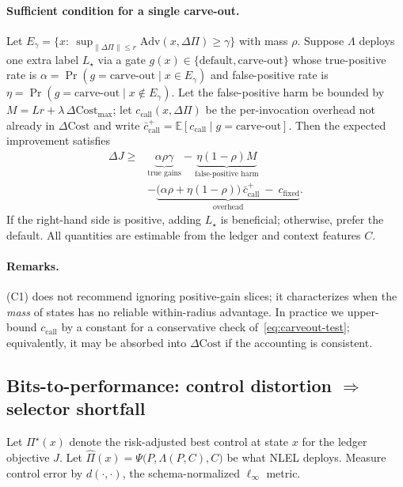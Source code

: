 \documentclass{article}
\theoremstyle{plain}
\theoremstyle{definition}
\theoremstyle{remark}
\begin{document}
\paragraph{Sufficient condition for a single carve-out.}
Let $E_\gamma=\{x:\ \sup_{\|\Delta\Pi\|\le r}\mathrm{Adv}(x,\Delta\Pi)\ge \gamma\}$ with mass $\rho$. 
Suppose $\Lambda$ deploys one extra label $L_\star$ via a gate $g(x)\in\{\text{default},\text{carve-out}\}$ whose true-positive rate is $\alpha=\Pr(g=\text{carve-out}\mid x\in E_\gamma)$ and false-positive rate is $\eta=\Pr(g=\text{carve-out}\mid x\notin E_\gamma)$. 
Let the false-positive harm be bounded by $M=Lr+\lambda\,\Delta\mathrm{Cost}_{\max}$; let $c_{\text{call}}(x,\Delta\Pi)$ be the per-invocation overhead not already in $\Delta\mathrm{Cost}$ and write $\bar c_{\text{call}}^{+}=\mathbb{E}[c_{\text{call}}\mid g=\text{carve-out}]$. 
Then the expected improvement satisfies
\begin{equation}\label{eq:carveout-test}
\begin{aligned}
\Delta J \ge {}& \underbrace{\alpha\rho\gamma}_{\text{true gains}}
 - \underbrace{\eta(1-\rho)M}_{\text{false-positive harm}} \\
& - \underbrace{\big(\alpha\rho+\eta(1-\rho)\big)\,\bar c_{\text{call}}^{+}\ -\ c_{\text{fixed}}}_{\text{overhead}}.
\end{aligned}
\end{equation}
If the right-hand side is positive, adding $L_\star$ is beneficial; otherwise, prefer the default. 
All quantities are estimable from the ledger and context features $C$.

\paragraph{Remarks.}
(C1) does not recommend ignoring positive-gain slices; it characterizes when the \emph{mass} of states has no reliable within-radius advantage. 
In practice we upper-bound $c_{\text{call}}$ by a constant for a conservative check of~\eqref{eq:carveout-test}; equivalently, it may be absorbed into $\Delta\mathrm{Cost}$ if the accounting is consistent.

\subsection{Bits-to-performance: control distortion $\Rightarrow$ selector shortfall}

Let $\Pi^\star(x)$ denote the risk-adjusted best control at state $x$ for the ledger objective $J$. 
Let $\widehat{\Pi}(x)=\Psi\big(P,\Lambda(P,C),C\big)$ be what NLEL deploys. 
Measure control error by $d(\cdot,\cdot)$, the schema-normalized $\ell_\infty$ metric.
\end{document}
